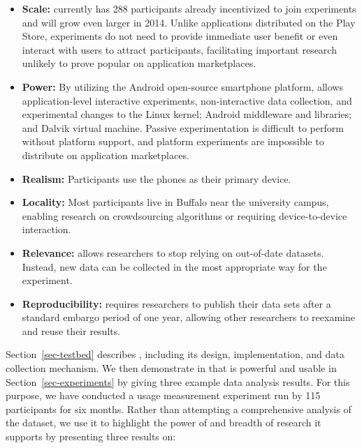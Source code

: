 \begin{itemize}

\item \textbf{Scale:} \PhoneLab{} currently has 288 participants already
incentivized to join experiments and will grow even larger in 2014. Unlike
applications distributed on the Play Store, \PhoneLab{} experiments do not
need to provide immediate user benefit or even interact with users to attract
participants, facilitating important research unlikely to prove popular on
application marketplaces.

\item \textbf{Power:} By utilizing the Android open-source smartphone
platform, \PhoneLab{} allows application-level interactive experiments,
non-interactive data collection, and experimental changes to the Linux
kernel; Android middleware and libraries; and Dalvik virtual machine. Passive
experimentation is difficult to perform without platform support, and
platform experiments are impossible to distribute on application
marketplaces.

\item \textbf{Realism:} Participants use the phones as their primary device.

\item \textbf{Locality:} Most participants live in Buffalo near the
university campus, enabling research on crowdsourcing algorithms or requiring
device-to-device interaction.

\item \textbf{Relevance:} \PhoneLab{} allows researchers to stop relying on
out-of-date datasets. Instead, new data can be collected in the most
appropriate way for the experiment.

\item \textbf{Reproducibility:} \PhoneLab{} requires researchers to publish
their data sets after a standard embargo period of one year, allowing other
researchers to reexamine and reuse their results.

\end{itemize}

Section~\ref{sec-testbed} describes \PhoneLab{}, including its design,
implementation, and data collection mechanism. We then demonstrate in that
\PhoneLab{} is powerful and usable in Section~\ref{sec-experiments} by giving
three example data analysis results. For this purpose, we have conducted a
usage measurement experiment run by 115 \PhoneLab{} participants for six
months. Rather than attempting a comprehensive analysis of the dataset, we
use it to highlight the power of \PhoneLab{} and breadth of research it
supports by presenting three results on:

